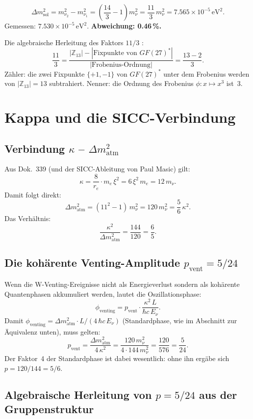 \[
\Delta m^2_\text{sol}=m_{\nu_2}^2-m_{\nu_1}^2
=\left(\frac{14}{3}-1\right)m_\nu^2=\frac{11}{3}\,m_\nu^2
=7.565\times10^{-5}\,\text{eV}^2.
\]
Gemessen: $7.530\times10^{-5}\,\text{eV}^2$.
\textbf{Abweichung: 0.46\,\%.}

Die algebraische Herleitung des Faktors $11/3$ \BM:
\[
\frac{11}{3}
=\frac{|\mathbb{Z}_{13}|-|\text{Fixpunkte von }GF(27)^*|}{|\text{Frobenius-Ordnung}|}
=\frac{13-2}{3}.
\]
Zähler: die zwei Fixpunkte $\{+1,-1\}$ von $GF(27)^*$ unter dem
Frobenius werden von $|\mathbb{Z}_{13}|=13$ subtrahiert.
Nenner: die Ordnung des Frobenius $\phi:x\mapsto x^3$ ist~3.

\section{Kappa und die SICC-Verbindung \KM}

\subsection{Verbindung $\kappa$ -- $\Delta m^2_\text{atm}$}

Aus Dok.~339 (und der SICC-Ableitung von Paul Masic) gilt:
\[
\kappa=\frac{8}{r_e}\cdot m_e\,\xi^2=6\,\xi^2\,m_e=12\,m_\nu.
\]
Damit folgt direkt:
\[
\Delta m^2_\text{atm}=(11^2-1)\,m_\nu^2=120\,m_\nu^2
=\frac{5}{6}\,\kappa^2.
\]
Das Verhältnis:
\[
\frac{\kappa^2}{\Delta m^2_\text{atm}}=\frac{144}{120}=\frac{6}{5}.
\]

\subsection{Die kohärente Venting-Amplitude $p_\text{vent}=5/24$ \BM}

Wenn die W-Venting-Ereignisse nicht als Energieverlust sondern als
kohärente Quantenphasen akkumuliert werden, lautet die
Oszillationsphase:
\[
\phi_\text{venting}=p_\text{vent}\cdot\frac{\kappa^2\,L}{\hbar c\,E_\nu}.
\]
Damit $\phi_\text{venting}=\Delta m^2_\text{atm}\cdot L/(4\,\hbar c\,E_\nu)$
(Standardphase, wie im Abschnitt zur Äquivalenz unten),
muss gelten:
\[
p_\text{vent}=\frac{\Delta m^2_\text{atm}}{4\,\kappa^2}
=\frac{120\,m_\nu^2}{4\cdot144\,m_\nu^2}=\frac{120}{576}=\frac{5}{24}.
\]
Der Faktor~4 der Standardphase ist dabei wesentlich: ohne ihn ergäbe sich
$p=120/144=5/6$.

\subsection{Algebraische Herleitung von $p=5/24$ aus der Gruppenstruktur \BM}

